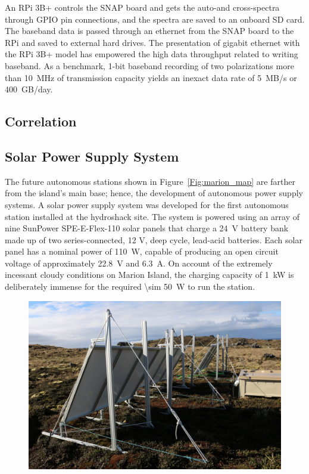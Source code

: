An RPi 3B+ controls the SNAP board and gets the auto-and cross-spectra through GPIO pin connections, and the spectra are saved to an onboard SD card. The baseband data is passed through an ethernet from the SNAP board to the RPi and saved to external hard drives. The presentation of gigabit ethernet with the RPi 3B+ model has empowered the high data throughput related to writing baseband. As a benchmark, 1-bit baseband recording of two polarizations more than \SI{10}{\mega\hertz} of transmission capacity yields an inexact data rate of 5~MB/s or 400~GB/day.

\subsection{Correlation}


\subsection{Solar Power Supply System}

The future autonomous stations shown in Figure~\ref{Fig:marion_map} are farther from the island's main base; hence, the development of autonomous power supply systems. A solar power supply system was developed for the first autonomous station installed at the hydroshack site. The system is powered using an array of nine SunPower SPE-E-Flex-110 solar panels that charge a \SI{24}{\volt} battery bank made up of two series-connected, 12 V, deep cycle, lead-acid batteries. Each solar panel has a nominal power of \SI{110}{\watt}, capable of producing an open circuit voltage of approximately \SI{22.8}{\volt} and \SI{6.3}{\ampere}. On account of the extremely incessant cloudy conditions on Marion Island, the charging capacity of \SI{1}{\kilo\watt} is deliberately immense for the required \SI{\sim 50}{\watt} to run the station.

\begin{figure}
	\centering
	\includegraphics[width=\linewidth]{Figures/40916139043_f3d0c6b013_o}
	\caption{}
	\label{fig:40916139043_f3d0c6b013_o}
\end{figure}

